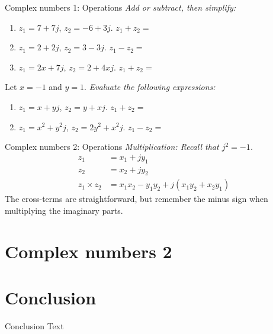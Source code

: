\documentclass{beamer}
\begin{document}
\begin{frame}{Complex numbers 1: Operations}
\textit{Add or subtract, then simplify:}
\begin{enumerate}
\item $z_1 = 7+7j$, $z_2 = -6+3j$.  $z_1+z_2 = $
\item $z_1 = 2+2j$, $z_2 = 3-3j$.  $z_1-z_2 = $
\item $z_1 = 2x+7j$, $z_2 = 2+4xj$.  $z_1+z_2 = $
\end{enumerate}
Let $x=-1$ and $y=1$.  \textit{Evaluate the following expressions:}
\begin{enumerate}
\item $z_1 = x+yj$, $z_2 = y+xj$.  $z_1+z_2 = $
\item $z_1 = x^2+y^2j$, $z_2 = 2y^2+x^2j$.  $z_1-z_2 = $
\end{enumerate}
\end{frame}

\begin{frame}{Complex numbers 2: Operations}
\textit{Multiplication: Recall that $j^2 = -1$.}
\begin{align}
z_1 &= x_1+jy_1 \\
z_2 &= x_2 + j y_2 \\
z_1 \times z_2 &= x_1 x_2 - y_1 y_2 + j (x_1 y_2 + x_2 y_1)
\end{align}
The cross-terms are straightforward, but remember the minus sign when multiplying the imaginary parts.
\end{frame}

\section{Complex numbers 2}

\section{Conclusion}

\begin{frame}{Conclusion}
Text
\end{frame}
\end{document}

